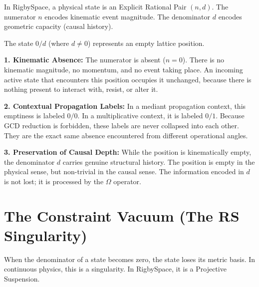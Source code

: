 \documentclass[11pt, letterpaper]{article}
\begin{document}
In RigbySpace, a physical state is an Explicit Rational Pair $(n,d)$. The numerator $n$ encodes kinematic event magnitude. The denominator $d$ encodes geometric capacity (causal history).

\begin{definition}\label{def:empty_lattice}
\begin{rsbox}
The state $0/d$ (where $d \neq 0$) represents an empty lattice position. 

\textbf{1. Kinematic Absence:}
The numerator is absent ($n=0$). There is no kinematic magnitude, no momentum, and no event taking place. An incoming active state that encounters this position occupies it unchanged, because there is nothing present to interact with, resist, or alter it.

\textbf{2. Contextual Propagation Labels:}
In a mediant propagation context, this emptiness is labeled $0/0$. In a multiplicative context, it is labeled $0/1$. Because GCD reduction is forbidden, these labels are never collapsed into each other. They are the exact same absence encountered from different operational angles.

\textbf{3. Preservation of Causal Depth:}
While the position is kinematically empty, the denominator $d$ carries genuine structural history. The position is empty in the physical sense, but non-trivial in the causal sense. The information encoded in $d$ is not lost; it is processed by the $\Omega$ operator.
\end{rsbox}
\end{definition}

\section{The Constraint Vacuum (The RS Singularity)}

When the denominator of a state becomes zero, the state loses its metric basis. In continuous physics, this is a singularity. In RigbySpace, it is a Projective Suspension.
\end{document}
